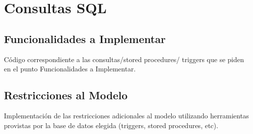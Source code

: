 \section{Consultas SQL}

\subsection{Funcionalidades a Implementar}
Código correspondiente a las consultas/stored procedures/ triggers que se piden en el punto Funcionalidades a Implementar.

\subsection{Restricciones al Modelo}
Implementación de las restricciones adicionales al modelo utilizando herramientas provistas por la base de datos elegida (triggers, stored procedures, etc).